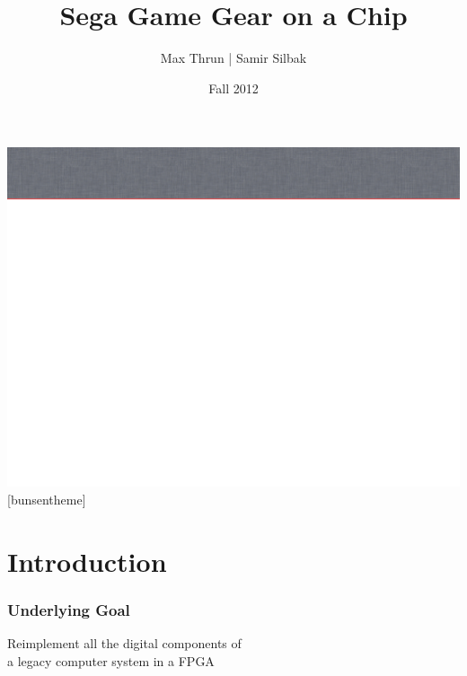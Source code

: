 \documentclass{beamer}
\title{Sega Game Gear on a Chip}
\author{Max Thrun | Samir Silbak}
\institute{University of Cincinnati}
\date{Fall 2012}
\begin{document}
\maketitle

%
%
{\includegraphics[width=\paperwidth,height=\paperheight]{slide_bg}}
[bunsentheme]

\section{Introduction}
\begin{frame}
\frametitle{Underlying Goal}
    \begin{center}
        \Large
        Reimplement all the digital components of \\a legacy computer system in a FPGA
    \end{center}
\end{frame}
\end{document}
